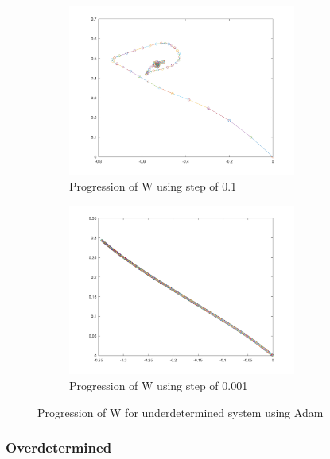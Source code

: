 \documentclass[a4paper]{article}    %
\begin{document}


\begin{figure}[H]
    \centering
    \begin{subfigure}{0.48\textwidth}
        \centering
        \includegraphics[width=7.5cm]{adam_under_step_0_1}
        \caption{Progression of W using step of 0.1}
        \label{fig:adam-under-0_1}
    \end{subfigure}
    \hfill
    \begin{subfigure}{0.48\textwidth}
        \centering
        \includegraphics[width=7.5cm]{adam_under_step_0_001}
        \caption{Progression of W using step of 0.001}
        \label{fig:adam-under-0_001}
    \end{subfigure}
    \hfill
    \caption{Progression of W for underdetermined system using Adam}
    \label{fig:adam-under}
\end{figure}

\newpage

\subsubsection{Overdetermined}


\end{document}
